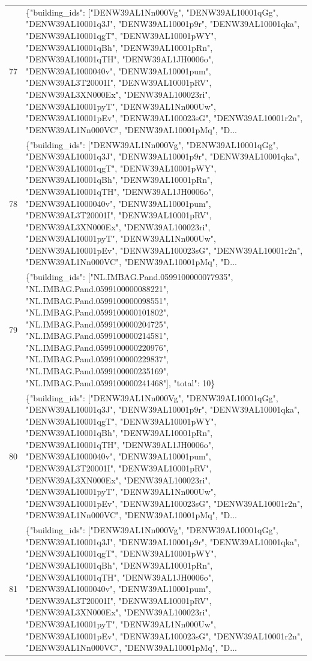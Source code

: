 \documentclass[a4paper,11pt]{article}
\begin{document}
\begin{table}[ht]
\begin{tabular}{r p{12cm}}
77 & \{"building\_ids": ["DENW39AL1Nn000Vg", "DENW39AL10001qGg", "DENW39AL10001q3J", "DENW39AL10001p9r", "DENW39AL10001qka", "DENW39AL10001qgT", "DENW39AL10001pWY", "DENW39AL10001qBh", "DENW39AL10001pRn", "DENW39AL10001qTH", "DENW39AL1JH0006o", "DENW39AL1000040v", "DENW39AL10001pum", "DENW39AL3T20001I", "DENW39AL10001pRV", "DENW39AL3XN000Ex", "DENW39AL100023ri", "DENW39AL10001pyT", "DENW39AL1Nn000Uw", "DENW39AL10001pEv", "DENW39AL100023sG", "DENW39AL10001r2n", "DENW39AL1Nn000VC", "DENW39AL10001pMq", "D... \\
78 & \{"building\_ids": ["DENW39AL1Nn000Vg", "DENW39AL10001qGg", "DENW39AL10001q3J", "DENW39AL10001p9r", "DENW39AL10001qka", "DENW39AL10001qgT", "DENW39AL10001pWY", "DENW39AL10001qBh", "DENW39AL10001pRn", "DENW39AL10001qTH", "DENW39AL1JH0006o", "DENW39AL1000040v", "DENW39AL10001pum", "DENW39AL3T20001I", "DENW39AL10001pRV", "DENW39AL3XN000Ex", "DENW39AL100023ri", "DENW39AL10001pyT", "DENW39AL1Nn000Uw", "DENW39AL10001pEv", "DENW39AL100023sG", "DENW39AL10001r2n", "DENW39AL1Nn000VC", "DENW39AL10001pMq", "D... \\
79 & \{"building\_ids": ["NL.IMBAG.Pand.0599100000077935", "NL.IMBAG.Pand.0599100000088221", "NL.IMBAG.Pand.0599100000098551", "NL.IMBAG.Pand.0599100000101802", "NL.IMBAG.Pand.0599100000204725", "NL.IMBAG.Pand.0599100000214581", "NL.IMBAG.Pand.0599100000220976", "NL.IMBAG.Pand.0599100000229837", "NL.IMBAG.Pand.0599100000235169", "NL.IMBAG.Pand.0599100000241468"], "total": 10\} \\
80 & \{"building\_ids": ["DENW39AL1Nn000Vg", "DENW39AL10001qGg", "DENW39AL10001q3J", "DENW39AL10001p9r", "DENW39AL10001qka", "DENW39AL10001qgT", "DENW39AL10001pWY", "DENW39AL10001qBh", "DENW39AL10001pRn", "DENW39AL10001qTH", "DENW39AL1JH0006o", "DENW39AL1000040v", "DENW39AL10001pum", "DENW39AL3T20001I", "DENW39AL10001pRV", "DENW39AL3XN000Ex", "DENW39AL100023ri", "DENW39AL10001pyT", "DENW39AL1Nn000Uw", "DENW39AL10001pEv", "DENW39AL100023sG", "DENW39AL10001r2n", "DENW39AL1Nn000VC", "DENW39AL10001pMq", "D... \\
81 & \{"building\_ids": ["DENW39AL1Nn000Vg", "DENW39AL10001qGg", "DENW39AL10001q3J", "DENW39AL10001p9r", "DENW39AL10001qka", "DENW39AL10001qgT", "DENW39AL10001pWY", "DENW39AL10001qBh", "DENW39AL10001pRn", "DENW39AL10001qTH", "DENW39AL1JH0006o", "DENW39AL1000040v", "DENW39AL10001pum", "DENW39AL3T20001I", "DENW39AL10001pRV", "DENW39AL3XN000Ex", "DENW39AL100023ri", "DENW39AL10001pyT", "DENW39AL1Nn000Uw", "DENW39AL10001pEv", "DENW39AL100023sG", "DENW39AL10001r2n", "DENW39AL1Nn000VC", "DENW39AL10001pMq", "D... \\

\end{tabular}
\end{table}
\end{document}
